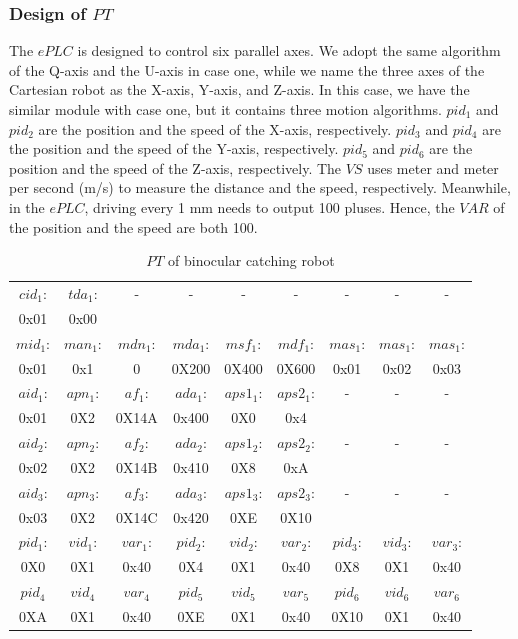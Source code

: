 \documentclass[journal,UTF8]{IEEEtran}
\begin{document}
	\subsubsection{Design of $PT$}
	The $ePLC$ is designed to control six parallel axes. We adopt the same algorithm of the Q-axis and the U-axis in case one, while we name the three axes of the Cartesian robot as the X-axis, Y-axis, and Z-axis. In this case, we have the similar module with case one, but it contains three motion algorithms. $pid_1$ and $pid_2$ are the position and the speed of the X-axis, respectively. $pid_3$ and $pid_4$ are the position and the speed of the Y-axis, respectively. $pid_5$ and $pid_6$ are the position and the speed of the Z-axis, respectively. The $VS$ uses meter and meter per second (m/s) to measure the distance and the speed, respectively. Meanwhile, in the $ePLC$, driving every 1 mm needs to output 100 pluses. Hence, the $VAR$ of the position and the speed are both 100. 
	\begin{table}
		\scriptsize \caption{$PT$ of binocular catching robot}
		\label{table:PTofRobot}
		\begin{center}
			\renewcommand{\arraystretch}{1.4}
			\setlength\tabcolsep{3pt}
			\begin{tabular}{|c|c|c|c|c|c|c|c|c|}
				\hline
				$cid_1$:  & $tda_1$:   &- &-& -  &- &-&-&- \\
				0x01&0x00&& &&&&&\\
				\hline
				$mid_1$:&$man_1$:&$mdn_1$:&$mda_1$:&$msf_1$:&$mdf_1$:&$mas_1$:&$mas_1$:&$mas_1$:\\
				0x01  &0x1 &   0    &0X200  &0X400  & 0X600 &0x01   &0x02   &0x03 \\
				\hline
				$aid_1$:  & $apn_1$:& $af_1$: &$ada_1$: &$aps1_1$:  &$aps2_1$:&-&-&-\\
				0x01     & 0X2    & 0X14A  &0x400 &0X0   &0x4 &&&\\
				\hline
				$aid_2$:  & $apn_2$:& $af_2$: &$ada_2$: &$aps1_2$:  &$aps2_2$:&-&-&-\\
				0x02     & 0X2    & 0X14B  &0x410  &0X8       &0xA &&&\\
				\hline
				$aid_3$:&$apn_3$:&$af_3$:&$ada_3$:&$aps1_3$:&$aps2_3$:&-&-&-\\
				0x03     & 0X2    & 0X14C  &0x420   &0XE       &0X10 &&&\\
				\hline
				$pid_1$:&$vid_1$:&$var_1$:&$pid_2$:&$vid_2$:&$var_2$: &$pid_3$:&$vid_3$:&$var_3$:\\
				0X0      & 0X1    & 0x40  &0X4     &0X1    & 0x40  &0X8      & 0X1    & 0x40\\
				\hline
				$pid_4$  &$vid_4$ &$var_4$ &$pid_5$ &$vid_5$&$var_5$ &$pid_6$  &$vid_6$ &$var_6$\\
				\hline
				0XA      & 0X1    & 0x40  &0XE     &0X1    & 0x40  &0X10     & 0X1    & 0x40\\
				\hline
			\end{tabular}
		\end{center}
	\end{table}
	
\end{document}
